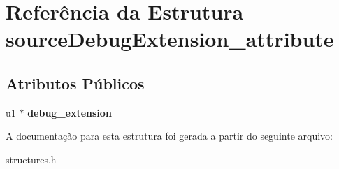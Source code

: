 \hypertarget{structsourceDebugExtension__attribute}{}\section{Referência da Estrutura source\+Debug\+Extension\+\_\+attribute}
\label{structsourceDebugExtension__attribute}
\subsection*{Atributos Públicos}
\begin{DoxyCompactItemize}
\item 
\mbox{\label{structsourceDebugExtension__attribute_a55b08753a7cc09bf7ca9e4b526445d7f}} 
u1 $\ast$ {\bfseries debug\+\_\+extension}
\end{DoxyCompactItemize}


A documentação para esta estrutura foi gerada a partir do seguinte arquivo\+:\begin{DoxyCompactItemize}
\item 
structures.\+h\end{DoxyCompactItemize}
